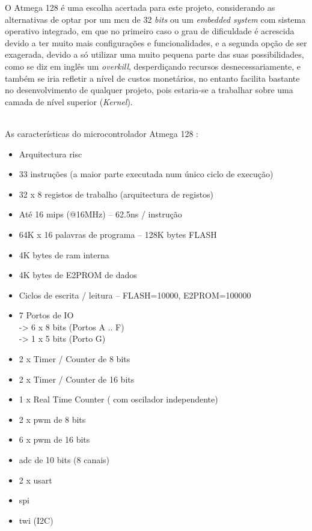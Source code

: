 O Atmega 128 é uma escolha acertada para este projeto, considerando as alternativas de optar por um \ac{mcu} de 32 \textit{bits} ou um \textit{embedded system} com sistema operativo integrado, em que no primeiro caso o grau de dificuldade é acrescida devido a ter muito mais configurações e funcionalidades, e a segunda opção de ser exagerada, devido a só utilizar uma muito pequena parte das suas possibilidades, como se diz em inglês um \textit{overkill}, desperdiçando recursos desnecessariamente, e também se iria refletir a nível de custos monetários, no entanto facilita bastante no desenvolvimento de qualquer projeto, pois estaria-se a trabalhar sobre uma camada de nível superior (\textit{Kernel}).
\\
\\
\begin{minipage}{\linewidth}
As características do microcontrolador Atmega 128 :
\normalsize
\begin{itemize}	
	\setlength\itemsep{-0.3em}
	\item Arquitectura \acs{risc}
	\item 33 instruções (a maior parte executada num único ciclo de execução)
	\item 32 x 8 registos de trabalho (arquitectura de registos)
	\item Até 16 \acs{mips} (@16MHz) – 62.5ns / instrução
	\item 64K x 16 palavras de programa – 128K bytes FLASH
	\item 4K bytes de \acs{ram} interna
	\item 4K bytes de E2PROM de dados
	\item Ciclos de escrita / leitura – FLASH=10000, E2PROM=100000
	\item 7 Portos de IO \\
		\hspace*{.5cm}	-> 6 x 8 bits (Portos A .. F) \\
		\hspace*{.5cm}	-> 1 x 5 bits (Porto G)
	\item 2 x Timer / Counter de 8 bits
	\item 2 x Timer / Counter de 16 bits
	\item 1 x Real Time Counter ( com oscilador independente)
	\item 2 x \acs{pwm} de 8 bits
	\item 6 x \acs{pwm} de 16 bits
	\item \acs{adc} de 10 bits (8 canais)
	\item 2 x \acs{usart}
	\item \acs{spi}
	\item \acs{twi} (I2C)
\end{itemize}
\end{minipage}
